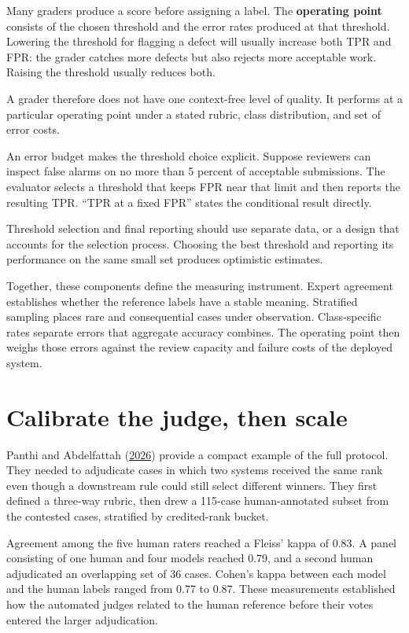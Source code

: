Many graders produce a score before assigning a label. The \textbf{operating point} consists of the chosen threshold and the error rates produced at that threshold. Lowering the threshold for flagging a defect will usually increase both TPR and FPR: the grader catches more defects but also rejects more acceptable work. Raising the threshold usually reduces both.

A grader therefore does not have one context-free level of quality. It performs at a particular operating point under a stated rubric, class distribution, and set of error costs.

An error budget makes the threshold choice explicit. Suppose reviewers can inspect false alarms on no more than 5 percent of acceptable submissions. The evaluator selects a threshold that keeps FPR near that limit and then reports the resulting TPR. ``TPR at a fixed FPR'' states the conditional result directly.

Threshold selection and final reporting should use separate data, or a design that accounts for the selection process. Choosing the best threshold and reporting its performance on the same small set produces optimistic estimates.

Together, these components define the measuring instrument. Expert agreement establishes whether the reference labels have a stable meaning. Stratified sampling places rare and consequential cases under observation. Class-specific rates separate errors that aggregate accuracy combines. The operating point then weighs those errors against the review capacity and failure costs of the deployed system.

\hypertarget{calibrate-the-judge-then-scale}{%
\section{Calibrate the judge, then scale}\label{calibrate-the-judge-then-scale}}

Panthi and Abdelfattah (\href{https://arxiv.org/abs/2605.24060}{2026}) provide a compact example of the full protocol. They needed to adjudicate cases in which two systems received the same rank even though a downstream rule could still select different winners. They first defined a three-way rubric, then drew a 115-case human-annotated subset from the contested cases, stratified by credited-rank bucket.

Agreement among the five human raters reached a Fleiss' kappa of 0.83. A panel consisting of one human and four models reached 0.79, and a second human adjudicated an overlapping set of 36 cases. Cohen's kappa between each model and the human labels ranged from 0.77 to 0.87. These measurements established how the automated judges related to the human reference before their votes entered the larger adjudication.

